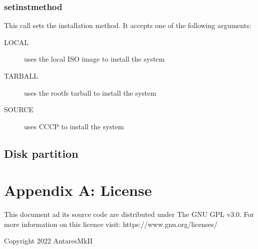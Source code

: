 \documentclass{scrartcl}
\begin{document}
\subsubsection{setinstmethod}
This call sets the installation method. It accepts one of the following
arguments:
\begin{description}
    \item[LOCAL] uses the local ISO image to install the system
    \item[TARBALL] uses the rootfs tarball to install the system
    \item[SOURCE] uses CCCP to install the system
\end{description}

\subsection{Disk partition}


\section*{Appendix A: License}
This document ad its source code are distributed under The GNU GPL v3.0. For
more information on this licence visit: https://www.gnu.org/licenses/

Copyright 2022 AntaresMkII
\end{document}
